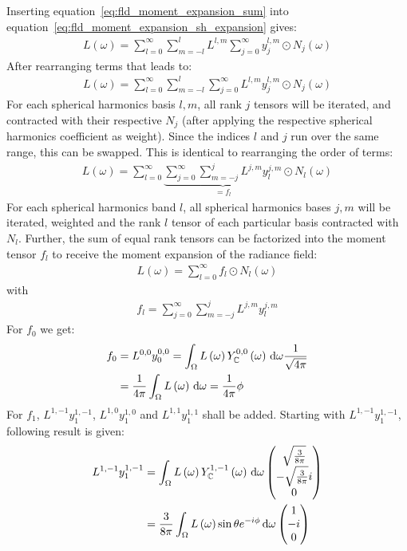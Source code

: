 Inserting equation~\ref{eq:fld_moment_expansion_sum} into equation~\ref{eq:fld_moment_expansion_sh_expansion} gives:
\begin{align}
L\left(\omega\right) =
\sum_{l=0}^{\infty}\sum_{m=-l}^{l}L^{l,m}\sum_{j=0}^\infty{y^{l,m}_j\odot N_j(\omega)}
\end{align}
After rearranging terms that leads to:
\begin{align}
L\left(\omega\right) =
\sum_{l=0}^{\infty}\sum_{m=-l}^{l}\sum_{j=0}^\infty{L^{l,m}y^{l,m}_j\odot N_j(\omega)}
\end{align}
For each spherical harmonics basis $l,m$, all rank $j$ tensors will be iterated, and contracted with their respective $N_j$ (after applying the respective spherical harmonics coefficient as weight). Since the indices $l$ and $j$ run over the same range, this can be swapped. This is identical to rearranging the order of terms:
\begin{align}
L\left(\omega\right) =
\sum_{l=0}^{\infty}\underbrace{\sum_{j=0}^\infty\sum_{m=-j}^{j}{L^{j,m}y^{j,m}_l}}_{=f_l}
\odot N_l(\omega)
\end{align}
For each spherical harmonics band $l$, all spherical harmonics bases $j,m$ will be iterated, weighted and the rank $l$ tensor of each particular basis contracted with $N_l$. Further, the sum of equal rank tensors can be factorized into the moment tensor $f_l$ to receive the moment expansion of the radiance field:
\begin{align}
L\left(\omega\right) =
\sum_{l=0}^{\infty}f_l\odot N_l(\omega)
\end{align}
with
\begin{align}
f_l = \sum_{j=0}^\infty\sum_{m=-j}^{j}{L^{j,m}y^{j,m}_l}
\end{align}
For $f_0$ we get:
\begin{align}
f_0 &= L^{0,0}y^{0,0}_0 = \int_\Omega{L\left(\omega\right)Y_{\mathbb{C}}^{0,0}\left(\omega\right)\,\mathrm{d}\omega}\frac{1}{\sqrt{4\pi}}\\
&=
\frac{1}{4\pi}\int_\Omega{L\left(\omega\right)\,\mathrm{d}\omega} =
\frac{1}{4\pi}\phi
\end{align}
For $f_1$, $L^{1,-1}y^{1,-1}_1$, $L^{1,0}y^{1,0}_1$ and $L^{1,1}y^{1,1}_1$ shall be added. Starting with $L^{1,-1}y^{1,-1}_1$, following result is given:
\begin{align}
L^{1,-1}y^{1,-1}_1 &= 
\int_\Omega{L\left(\omega\right)Y_{\mathbb{C}}^{1,-1}\left(\omega\right)\,\mathrm{d}\omega}
\begin{pmatrix}\sqrt{\frac{3}{8\pi}}  \\ -\sqrt{\frac{3}{8\pi}}i \\ 0 \end{pmatrix}
\\
&= 
\frac{3}{8\pi}\int_\Omega{L\left(\omega\right)\operatorname{sin}\theta e^{-i\phi}\,\mathrm{d}\omega}
\begin{pmatrix}1  \\ -i \\ 0 \end{pmatrix}
\end{align}
